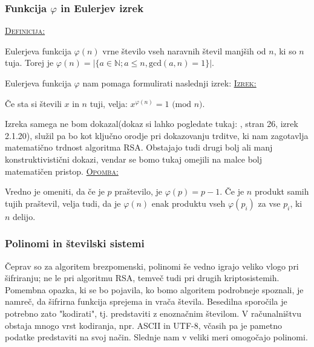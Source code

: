 \documentclass[a4paper, 12pt]{article} %
\newenvironment{matematika}[1]{
\textcolor{bostonuniversityred}{\underline{\textsc{#1:}}}
}{
}
\begin{document}
\subsubsection{Funkcija $\varphi$ in Eulerjev izrek}

\begin{matematika}{Definicija}
Eulerjeva funkcija $\varphi (n)$ vrne število vseh naravnih števil manjših od $n$, ki so $n$ tuja. Torej je $\varphi (n) = | \{ a \in \mathbb{N}; a \leq n, \text{gcd}(a, n) = 1 \} |$. \\
\end{matematika}

Eulerjeva funkcija $\varphi$ nam pomaga formulirati naslednji izrek:
\newline
\newline
\begin{matematika}{Izrek}
Če sta si števili $x$ in $n$ tuji, velja:
$x^{\varphi (n)} = 1 \text{ (mod } n)$. \\
\end{matematika}

Izreka samega ne bom dokazal(dokaz si lahko pogledate tukaj: \cite{clanek}, stran 26, izrek 2.1.20), služil pa bo kot ključno orodje pri dokazovanju trditve, ki nam zagotavlja matematično trdnost algoritma RSA. Obstajajo tudi drugi bolj ali manj konstruktivistični dokazi, vendar se bomo tukaj omejili na malce bolj matematičen pristop.
\newline
\newline
\begin{matematika}{Opomba}
Vredno je omeniti, da če je $p$ praštevilo, je $\varphi (p) = p - 1$. Če je $n$ produkt samih tujih praštevil, velja tudi, da je $\varphi (n)$ enak produktu vseh $\varphi (p_i)$ za vse $p_i$, ki $n$ delijo.
\end{matematika}

\subsubsection{Polinomi in številski sistemi}

Čeprav so za algoritem brezpomenski, polinomi še vedno igrajo veliko vlogo pri šifriranju; ne le pri algoritmu RSA, temveč tudi pri drugih kriptosistemih. Pomembna opazka, ki se bo pojavila, ko bomo algoritem podrobneje spoznali, je namreč, da šifrirna funkcija sprejema in vrača števila. Besedilna sporočila je potrebno zato "kodirati", tj. predstaviti z enoznačnim številom. V računalništvu obstaja mnogo vrst kodiranja, npr. ASCII in UTF-8, včasih pa je pametno podatke predstaviti na svoj način. Slednje nam v veliki meri omogočajo polinomi. \\
\end{document}
